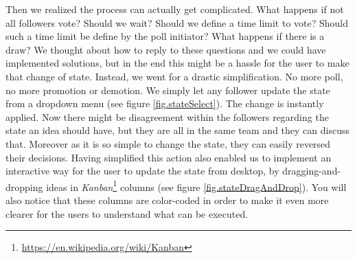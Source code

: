 \documentclass[a4paper,12pt,twoside]{article}
\begin{document}
Then we realized the process can actually get complicated.
What happens if not all followers vote?
Should we wait?
Should we define a time limit to vote? Should such a time limit be define by the poll initiator?
What happens if there is a draw?
We thought about how to reply to these questions and we could have implemented solutions, but in the end this might be a hassle for the user to make that change of state.
Instead, we went for a drastic simplification.
No more poll, no more promotion or demotion.
We simply let any follower update the state from a dropdown menu (see figure \ref{fig.stateSelect}).
The change is instantly applied.
Now there might be disagreement within the followers regarding the state an idea should have, but they are all in the same team and they can discuss that.
Moreover as it is so simple to change the state, they can easily reversed their decisions.
Having simplified this action also enabled us to implement an interactive way for the user to update the state from desktop, by dragging-and-dropping ideas in \emph{Kanban}\footnote{\url{https://en.wikipedia.org/wiki/Kanban}} columns (see figure \ref{fig.stateDragAndDrop}).
You will also notice that these columns are color-coded in order to make it even more clearer for the users to understand what can be executed.
\end{document}
